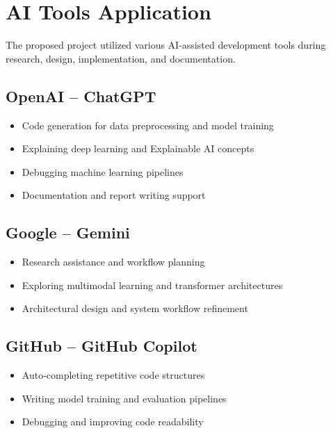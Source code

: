 \documentclass[12pt,a4paper]{report}
\begin{document}
\chapter{AI Tools Application}

The proposed project utilized various AI-assisted development tools during research, design, implementation, and documentation.

\section{OpenAI -- ChatGPT}

\begin{itemize}
    \item Code generation for data preprocessing and model training
    \item Explaining deep learning and Explainable AI concepts
    \item Debugging machine learning pipelines
    \item Documentation and report writing support
\end{itemize}

\section{Google -- Gemini}

\begin{itemize}
    \item Research assistance and workflow planning
    \item Exploring multimodal learning and transformer architectures
    \item Architectural design and system workflow refinement
\end{itemize}

\section{GitHub -- GitHub Copilot}

\begin{itemize}
    \item Auto-completing repetitive code structures
    \item Writing model training and evaluation pipelines
    \item Debugging and improving code readability
\end{itemize}
\end{document}

